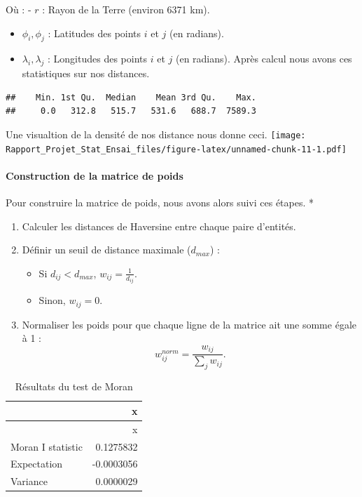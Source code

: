 \documentclass[
]{article}
\providecommand{\tightlist}{%
  \setlength{\itemsep}{0pt}\setlength{\parskip}{0pt}}
\begin{document}
Où : - \(r\) : Rayon de la Terre (environ 6371 km).

\begin{itemize}
\item
  \(\phi_i, \phi_j\) : Latitudes des points \(i\) et \(j\) (en radians).
\item
  \(\lambda_i, \lambda_j\) : Longitudes des points \(i\) et \(j\) (en
  radians). Après calcul nous avons ces statistiques sur nos distances.
\end{itemize}

\begin{verbatim}
##    Min. 1st Qu.  Median    Mean 3rd Qu.    Max. 
##     0.0   312.8   515.7   531.6   688.7  7589.3
\end{verbatim}

Une visualtion de la densité de nos distance nous donne ceci.
\texttt{[image: Rapport\_Projet\_Stat\_Ensai\_files/figure-latex/unnamed-chunk-11-1.pdf]}

\paragraph{Construction de la matrice de
poids}\label{construction-de-la-matrice-de-poids}

Pour construire la matrice de poids, nous avons alors suivi ces étapes.
*

\begin{enumerate}
\def\labelenumi{\arabic{enumi}.}
\tightlist
\item
  Calculer les distances de Haversine entre chaque paire d'entités.
\item
  Définir un seuil de distance maximale (\(d_{max}\)) :

  \begin{itemize}
  \tightlist
  \item
    Si \(d_{ij} < d_{max}\), \(w_{ij} = \frac{1}{d_{ij}}\).
  \item
    Sinon, \(w_{ij} = 0\).
  \end{itemize}
\item
  Normaliser les poids pour que chaque ligne de la matrice ait une somme
  égale à 1 : \[
   w_{ij}^{norm} = \frac{w_{ij}}{\sum_{j} w_{ij}}.
  \]
\end{enumerate}

\begin{longtable}[]{@{}lr@{}}
\caption{Résultats du test de Moran}\tabularnewline
\toprule\noalign{}
& x \\
\midrule\noalign{}
\endfirsthead
\toprule\noalign{}
& x \\
\midrule\noalign{}
\endhead
\bottomrule\noalign{}
\endlastfoot
Moran I statistic & 0.1275832 \\
Expectation & -0.0003056 \\
Variance & 0.0000029 \\
\end{longtable}
\end{document}

